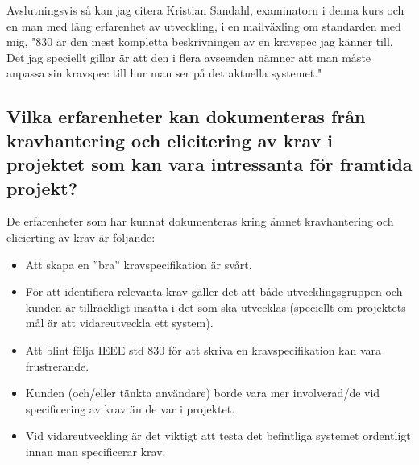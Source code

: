 Avslutningsvis så kan jag citera Kristian Sandahl, examinatorn i denna kurs och en man med lång erfarenhet av utveckling, i en mailväxling om standarden med mig, "830 är den mest kompletta beskrivningen av en kravspec jag känner till. Det jag speciellt gillar är att den i flera avseenden nämner att man måste anpassa sin kravspec till hur man ser på det aktuella systemet."   
\subsection{Vilka erfarenheter kan dokumenteras från kravhantering och elicitering av krav i projektet som kan vara intressanta för framtida projekt?}
De erfarenheter som har kunnat dokumenteras kring ämnet kravhantering och elicierting av krav är följande:
\begin{itemize}
	\item Att skapa en ”bra” kravspecifikation är svårt.
	\item För att identifiera relevanta krav gäller det att både utvecklingsgruppen och kunden är tillräckligt insatta i det som ska utvecklas (speciellt om projektets mål är att vidareutveckla ett system).
	\item Att blint följa IEEE std 830 för att skriva en kravspecifikation kan vara frustrerande.
	\item Kunden (och/eller tänkta användare) borde vara mer involverad/de vid specificering av krav än de var i projektet.
	\item Vid vidareutveckling är det viktigt att testa det befintliga systemet ordentligt innan man specificerar krav.
\end{itemize}


